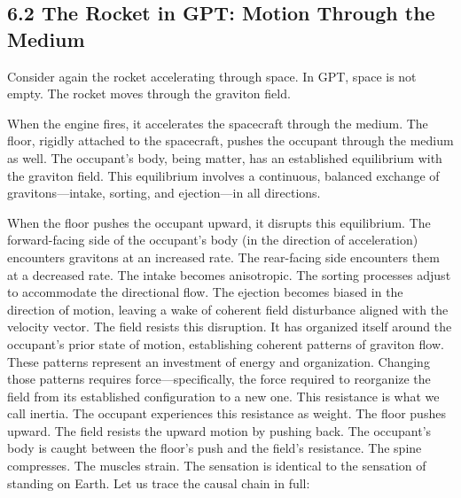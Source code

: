 \documentclass[11pt]{article}
\begin{document}
\begin{itemize}
\end{itemize}

\subsection{6.2 The Rocket in GPT: Motion Through the Medium}

Consider again the rocket accelerating through space. In GPT, space is not empty. The rocket moves through the graviton field.

When the engine fires, it accelerates the spacecraft through the medium. The floor, rigidly attached to the spacecraft, pushes the occupant through the medium as well. The occupant's body, being matter, has an established equilibrium with the graviton field. This equilibrium involves a continuous, balanced exchange of gravitons---intake, sorting, and ejection---in all directions.

When the floor pushes the occupant upward, it disrupts this equilibrium. The forward-facing side of the occupant's body (in the direction of acceleration) encounters gravitons at an increased rate. The rear-facing side encounters them at a decreased rate. The intake becomes anisotropic. The sorting processes adjust to accommodate the directional flow. The ejection becomes biased in the direction of motion, leaving a wake of coherent field disturbance aligned with the velocity vector. The field resists this disruption. It has organized itself around the occupant's prior state of motion, establishing coherent patterns of graviton flow. These patterns represent an investment of energy and organization. Changing those patterns requires force---specifically, the force required to reorganize the field from its established configuration to a new one. This resistance is what we call inertia. The occupant experiences this resistance as weight. The floor pushes upward. The field resists the upward motion by pushing back. The occupant's body is caught between the floor's push and the field's resistance. The spine compresses. The muscles strain. The sensation is identical to the sensation of standing on Earth. Let us trace the causal chain in full:
\end{document}
